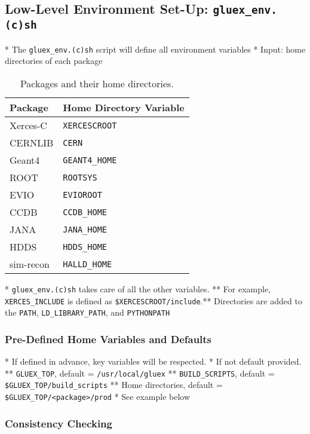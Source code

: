 \documentclass[12pt]{article}
\begin{document}
\subsection{Low-Level Environment Set-Up: {\tt gluex\_env.(c)sh}}
\label{section:low-level-environment-setting}

* The {\tt gluex\_env.(c)sh} script will define all environment variables
* Input: home directories of each package

\begin{table}
\begin{center}
\begin{tabular}{|l|l|}
\hline
\bf Package & \bf Home Directory Variable \\
\hline Xerces-C & {\tt XERCESCROOT} \\
CERNLIB & {\tt CERN} \\
Geant4 & {\tt GEANT4\_HOME} \\
ROOT & {\tt ROOTSYS} \\
EVIO & {\tt EVIOROOT} \\
CCDB & {\tt CCDB\_HOME} \\
JANA & {\tt JANA\_HOME} \\
HDDS & {\tt HDDS\_HOME} \\
sim-recon & {\tt HALLD\_HOME} \\
\hline
\end{tabular}
\end{center}
\caption{Packages and their home directories.}\label{table:home-directories}
\end{table}

* {\tt gluex\_env.(c)sh} takes care of all the other variables.
** For example, {\tt XERCES\_INCLUDE} is defined as {\tt \$XERCESCROOT/include}.** Directories are added to the {\tt PATH}, {\tt LD\_LIBRARY\_PATH}, and {\tt PYTHONPATH}

\subsubsection{Pre-Defined Home Variables and Defaults}

* If defined in advance, key variables will be respected.
* If not default provided.
** {\tt GLUEX\_TOP}, default =  {\tt /usr/local/gluex}
** {\tt BUILD\_SCRIPTS}, default = {\tt \$GLUEX\_TOP/build\_scripts}
** Home directories, default = {\tt \$GLUEX\_TOP/<package>/prod}
* See example below

\subsubsection{Consistency Checking}
\end{document}

